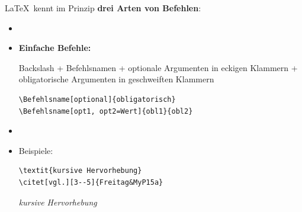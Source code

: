 
\begin{frame}[fragile]

\LaTeX\ kennt im Prinzip \textbf{drei Arten von Befehlen}:

\begin{itemize}

\item[]
\item \textbf{Einfache Befehle:}

Backslash \gqq{\textbackslash} + Befehlsnamen + optionale Argumenten in eckigen Klammern + obligatorische Argumenten in geschweiften Klammern


\begin{lstlisting}
\Befehlsname[optional]{obligatorisch} 
\Befehlsname[opt1, opt2=Wert]{obl1}{obl2}
\end{lstlisting}

\pause 

\item[]
\item Beispiele:

\begin{lstlisting}
\textit{kursive Hervorhebung} 
\citet[vgl.][3--5]{Freitag&MyP15a}
\end{lstlisting}

\pause 

\ea \textit{kursive Hervorhebung} 
\ex \citet[vgl.][3--5]{Freitag&MyP15a}
\z 

\end{itemize}

\end{frame}




